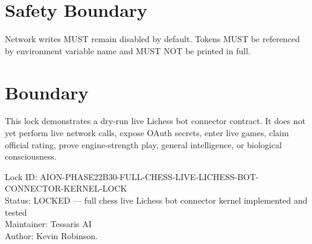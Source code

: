 \documentclass[11pt,a4paper]{article}
\begin{document}
\section{Safety Boundary}

Network writes MUST remain disabled by default. Tokens MUST be referenced by environment variable name and MUST NOT be printed in full.

\section{Boundary}

This lock demonstrates a dry-run live Lichess bot connector contract. It does not yet perform live network calls, expose OAuth secrets, enter live games, claim official rating, prove engine-strength play, general intelligence, or biological consciousness.

\bigskip

\noindent
Lock ID: AION-PHASE22B30-FULL-CHESS-LIVE-LICHESS-BOT-CONNECTOR-KERNEL-LOCK\\
Status: LOCKED --- full chess live Lichess bot connector kernel implemented and tested\\
Maintainer: Tessaris AI\\
Author: Kevin Robinson.
\end{document}
